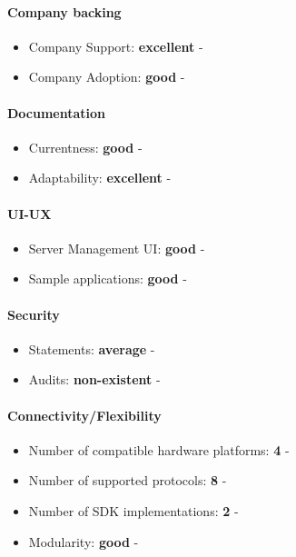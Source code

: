 \documentclass{article}
\begin{document}
\paragraph{Company backing}

\begin{itemize}
\item Company Support: \textbf{excellent} - 
\item Company Adoption: \textbf{good} - 
\end{itemize}

\paragraph{Documentation}

\begin{itemize}
\item Currentness: \textbf{good} - 
\item Adaptability: \textbf{excellent} - 
\end{itemize}

\paragraph{UI-UX}

\begin{itemize}
\item Server Management UI: \textbf{good} - 
\item Sample applications: \textbf{good} - 
\end{itemize}

\paragraph{Security} 

\begin{itemize}
\item Statements: \textbf{average} - 
\item Audits: \textbf{non-existent} - 
\end{itemize}

\paragraph{Connectivity/Flexibility}

\begin{itemize}
\item Number of compatible hardware platforms: \textbf{4} - 
\item Number of supported protocols: \textbf{8} - 
\item Number of SDK implementations: \textbf{2} - 
\item Modularity: \textbf{good} - 
\end{itemize}
\end{document}

